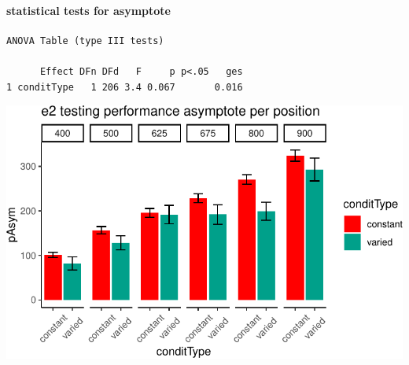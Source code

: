 \documentclass[
  12pt,
  letterpaper,
]{article}
\begin{document}
\paragraph{statistical tests for
asymptote}\label{statistical-tests-for-asymptote}

\begin{verbatim}
ANOVA Table (type III tests)

      Effect DFn DFd   F     p p<.05   ges
1 conditType   1 206 3.4 0.067       0.016
\end{verbatim}

\includegraphics{full_files/figure-pdf/unnamed-chunk-71-1.pdf}


\printbibliography[title=References]
\end{document}

